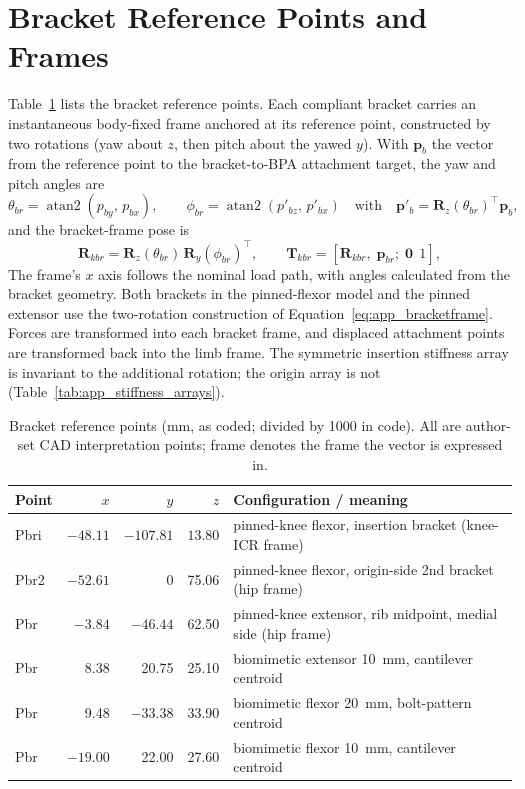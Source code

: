 \section{Bracket Reference Points and Frames}

Table~\ref{tab:app_bracket_points} lists the bracket reference points. Each compliant bracket carries an instantaneous body-fixed frame anchored at its reference point, constructed by two rotations (yaw about $z$, then pitch about the yawed $y$). With $\mathbf{p}_{b}$ the vector from the reference point to the bracket-to-BPA attachment target, the yaw and pitch angles are
\begin{equation}
    \theta_{br} = \operatorname{atan2}(p_{by},\, p_{bx}),
    \qquad
    \phi_{br} = \operatorname{atan2}(p'_{bz},\, p'_{bx})
    \quad\text{with}\quad
    \mathbf{p}'_{b} = \mathbf{R}_{z}(\theta_{br})^{\top}\mathbf{p}_{b},
    \label{eq:app_bracketangles}
\end{equation}
and the bracket-frame pose is
\begin{equation}
    \mathbf{R}_{kbr} = \mathbf{R}_{z}(\theta_{br})\,\mathbf{R}_{y}(\phi_{br})^{\top},
    \qquad
    \mathbf{T}_{kbr} = \left[\mathbf{R}_{kbr},\; \mathbf{p}_{br};\; \mathbf{0}\;\,1\right],
    \label{eq:app_bracketframe}
\end{equation}
The frame's $x$ axis follows the nominal load path, with angles calculated from the bracket geometry. Both brackets in the pinned-flexor model and the pinned extensor use the two-rotation construction of Equation~\eqref{eq:app_bracketframe}. Forces are transformed into each bracket frame, and displaced attachment points are transformed back into the limb frame. The symmetric insertion stiffness array is invariant to the additional rotation; the origin array is not (Table~\ref{tab:app_stiffness_arrays}).

\begin{table}[htbp]
\caption{Bracket reference points (mm, as coded; divided by 1000 in code). All are author-set CAD interpretation points; frame denotes the frame the vector is expressed in.}
\label{tab:app_bracket_points}
\begin{tabularx}{\textwidth}{@{}lrrrX@{}}
\toprule
\textbf{Point} & $x$ & $y$ & $z$ & \textbf{Configuration / meaning} \\
\midrule
Pbri & $-48.11$ & $-107.81$ & $13.80$ & pinned-knee flexor, insertion bracket (knee-ICR frame) \\
Pbr2 & $-52.61$ & 0 & 75.06 & pinned-knee flexor, origin-side 2nd bracket (hip frame) \\
Pbr  & $-3.84$  & $-46.44$ & 62.50 & pinned-knee extensor, rib midpoint, medial side (hip frame) \\
Pbr  & 8.38 & 20.75 & 25.10 & biomimetic extensor \qty{10}{\mm}, cantilever centroid \\
Pbr  & 9.48 & $-33.38$ & 33.90 & biomimetic flexor \qty{20}{\mm}, bolt-pattern centroid \\
Pbr  & $-19.00$ & 22.00 & 27.60 & biomimetic flexor \qty{10}{\mm}, cantilever centroid \\
\bottomrule
\end{tabularx}
\end{table}

